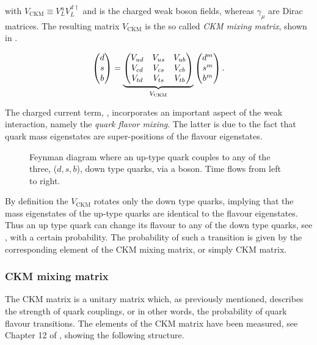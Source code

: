 \noindent with $V_{\text{CKM}} \equiv V^u_LV^{d\dagger}_L$ and \Wpm is the charged weak boson fields, whereas $\gamma_\mu$ are Dirac matrices.
The resulting matrix $V_{\text{CKM}}$ is the so called {\it CKM mixing matrix}, shown in .

\begin{equation}
  \centering
  \begin{pmatrix} \dquark \\ \squark \\ \bquark  \end{pmatrix} =
  \underbrace{\begin{pmatrix} \Vud & \Vus & \Vub \\ \Vcd & \Vcs & \Vcb \\ \Vtd & \Vts & \Vtb \end{pmatrix}}_{V_{\text{CKM}}}
    \begin{pmatrix} \dquark^m \\ \squark^m \\ \bquark^m  \end{pmatrix}.
      \label{quark_field_rotation}
  \end{equation}

The charged current term, , incorporates an important aspect of the weak interaction,
namely the {\it quark flavor mixing}. The latter is due to the fact that quark mass eigenstates are super-positions
of the flavour eigenstates.

\begin{figure}[h!]
  \centering
  {\sffamily }
  \caption{Feynman diagram where an up-type quark couples to any of the three, ($d,s,b$), down type quarks,
           via a \Wp boson. Time flows from left to right.}
  \label{QuarkMixing}
\end{figure}

\noindent By definition the $V_{\text{CKM}}$ rotates only the down type quarks, implying that
the mass eigenstates of the up-type quarks are identical to the flavour eigenstates. Thus an up type quark
can change its flavour to any of the down type quarks, see , with a certain probability.
The probability of such a transition is given by the corresponding element of the CKM mixing matrix, or simply CKM matrix.

\subsubsection{CKM mixing matrix}
The CKM matrix is a unitary matrix which, as previously mentioned, describes the strength of quark couplings, or in other words, 
the probability of quark flavour transitions. The elements of the CKM matrix have been measured, see \eg Chapter 12 of \cite{PDG},
showing the following structure.

